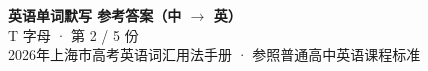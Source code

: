 \documentclass[10pt,a4paper]{article}
\begin{document}
\pagestyle{plain}

\begin{center}
{\LARGE\bfseries 英语单词默写 \quad 参考答案（中 $\to$ 英）}\\[0.22em]
{\large T 字母 · 第 2 / 5 份}\\[0.18em]
{\small 2026年上海市高考英语词汇用法手册 · 参照普通高中英语课程标准}
\end{center}

\vspace{0.2em}
\noindent{\color{rulegray}\rule{\textwidth}{0.8pt}}

\vspace{0.35em}

\vspace{0.25em}
\renewcommand{\arraystretch}{1.32}
\end{document}

